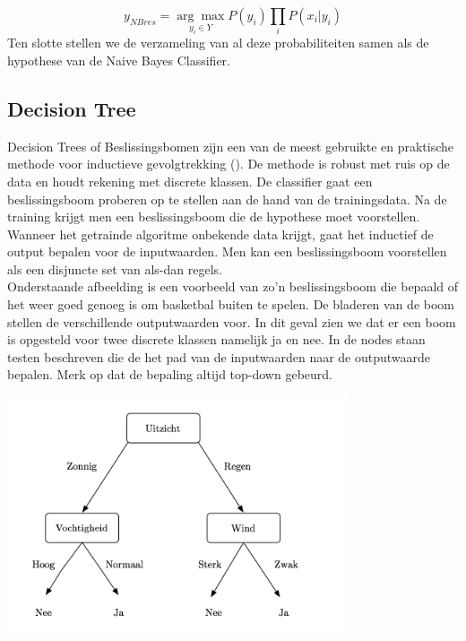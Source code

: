  \[y_{NBres} = \underset{y_i \in Y}{\arg\max} P(y_{i})\prod\limits_{i} P(x_{i}|y_{i}) \]
%
Ten slotte stellen we de verzameling van al deze probabiliteiten samen als de hypothese van de Naive Bayes Classifier.

\subsection{Decision Tree}\label{Decision Tree}
%
Decision Trees of Beslissingsbomen zijn een van de meest gebruikte en praktische methode voor inductieve gevolgtrekking (\cite{mitchell1997machine}). De methode is robust met ruis op de data en houdt rekening met discrete klassen. De classifier gaat een beslissingsboom proberen op te stellen aan de hand van de trainingsdata. Na de training krijgt men een beslissingsboom die de hypothese moet voorstellen. Wanneer het getrainde algoritme onbekende data krijgt, gaat het inductief de output bepalen voor de inputwaarden. Men kan een beslissingsboom voorstellen als een disjuncte set van als-dan regels.\\ 
%
Onderstaande afbeelding is een voorbeeld van zo'n beslissingsboom die bepaald of het weer goed genoeg is om basketbal buiten te spelen. De bladeren van de boom stellen de verschillende outputwaarden voor. In dit geval zien we dat er een boom is opgesteld voor twee discrete klassen namelijk ja en nee. In de nodes staan testen beschreven die de het pad van de inputwaarden naar de outputwaarde bepalen. Merk op dat de bepaling altijd top-down gebeurd.
%
\begin{center}
  \includegraphics[width=10cm]{decisiontree}
  \label{fig:beslissingsboom}
\end{center}
